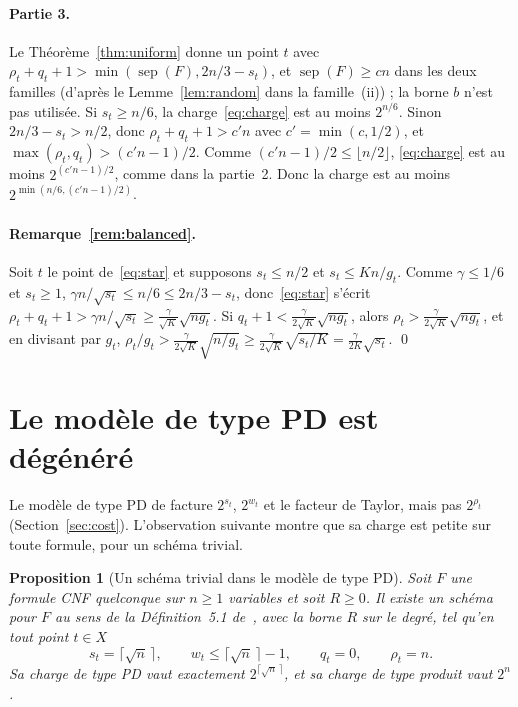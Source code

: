 \documentclass[11pt,a4paper]{article}
\newtheorem{proposition}[theorem]{Proposition}
\theoremstyle{definition}
\theoremstyle{remark}
\newcommand{\sep}{\operatorname{sep}}
\begin{document}
\paragraph{Partie 3.} Le Théorème~\ref{thm:uniform} donne un point $t$ avec
$\rho_t+q_t+1>\min(\sep(F),2n/3-s_t)$, et $\sep(F)\ge cn$ dans les deux familles (d'après le
Lemme~\ref{lem:random} dans la famille~(ii)) ; la borne $b$ n'est pas utilisée. Si
$s_t\ge n/6$, la charge~\eqref{eq:charge} est au moins $2^{n/6}$. Sinon $2n/3-s_t>n/2$, donc
$\rho_t+q_t+1>c'n$ avec $c'=\min(c,1/2)$, et $\max(\rho_t,q_t)>(c'n-1)/2$. Comme
$(c'n-1)/2\le\lfloor n/2\rfloor$, \eqref{eq:charge} est au moins $2^{(c'n-1)/2}$, comme
dans la partie~2. Donc la charge est au moins $2^{\min(n/6,(c'n-1)/2)}$.

\paragraph{Remarque~\ref{rem:balanced}.} Soit $t$ le point de~\eqref{eq:star} et supposons
$s_t\le n/2$ et $s_t\le Kn/g_t$. Comme $\gamma\le1/6$ et $s_t\ge1$,
$\gamma n/\sqrt{s_t}\le n/6\le2n/3-s_t$, donc~\eqref{eq:star} s'écrit
$\rho_t+q_t+1>\gamma n/\sqrt{s_t}\ge\frac{\gamma}{\sqrt K}\sqrt{ng_t}$. Si
$q_t+1<\frac{\gamma}{2\sqrt K}\sqrt{ng_t}$, alors
$\rho_t>\frac{\gamma}{2\sqrt K}\sqrt{ng_t}$, et en divisant par $g_t$,
$\rho_t/g_t>\frac{\gamma}{2\sqrt K}\sqrt{n/g_t}\ge\frac{\gamma}{2\sqrt K}\sqrt{s_t/K}
=\frac{\gamma}{2K}\sqrt{s_t}$. \qed

\section{Le modèle de type PD est dégénéré}\label{sec:dp}

Le modèle de type PD de \cite[Section~5.2]{DL} facture $2^{s_t}$, $2^{w_t}$ et le facteur de
Taylor, mais pas $2^{\rho_t}$ (Section~\ref{sec:cost}). L'observation suivante montre que sa
charge est petite sur toute formule, pour un schéma trivial.

\begin{proposition}[Un schéma trivial dans le modèle de type PD]\label{prop:dp}
Soit $F$ une formule CNF quelconque sur $n\ge1$ variables et soit $R\ge0$. Il existe un
schéma pour $F$ au sens de la Définition~5.1 de~\cite{DL}, avec la borne $R$ sur le degré,
tel qu'en tout point $t\in X$
\[
s_t=\lceil\sqrt n\,\rceil,\qquad w_t\le\lceil\sqrt n\,\rceil-1,\qquad q_t=0,\qquad\rho_t=n .
\]
Sa charge de type PD vaut exactement $2^{\lceil\sqrt n\,\rceil}$, et sa charge de type
produit vaut $2^n$.
\end{proposition}
\end{document}
